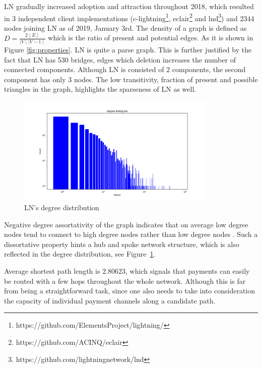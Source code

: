 \documentclass[a4paper]{article}
\theoremstyle{definition}
\begin{document}
LN gradually increased adoption and attraction throughout 2018, which resulted in 3 independent client implementations (c-lightning\footnote{https://github.com/ElementsProject/lightning/}, eclair\footnote{https://github.com/ACINQ/eclair} and lnd\footnote{https://github.com/lightningnetwork/lnd}) and \num[group-separator={,}]{2344} nodes joining LN as of 2019, January 3rd. The density of a graph is defined as $D=\frac{2\mid E\mid}{\mid V\mid \mid V-1\mid}$  which is the ratio of present and potential edges. As it is shown in Figure \ref{fig:properties}. LN is quite a parse graph. This is further justified by the fact that LN has \num[group-separator={,}]{530} bridges, edges which deletion increases the number of connected components. Although LN is consisted of $2$ components, the second component has only $3$ nodes. The low transitivity, fraction of present and possible triangles in the graph, highlights the sparseness of LN as well.

\begin{figure}
	\caption{LN's degree distribution}\label{fig:degreedist}
	\begin{center}
		\includegraphics[width=0.85\textwidth]{degreehistogramloglogscale.png}
	\end{center}	
\end{figure}

Negative degree assortativity of the graph indicates that on average low degree nodes tend to connect to high degree nodes rather than low degree nodes \cite{newman2002assortative}. Such a dissortative property hints a hub and spoke network structure, which is also reflected in the degree distribution, see Figure~\ref{fig:degreedist}.

Average shortest path length is $2.80623$, which signals that payments can easily be routed with a few hops throughout the whole network. Although this is far from being a straightforward task, since one also needs to take into consideration the capacity of individual payment channels along a candidate path.
\end{document}
